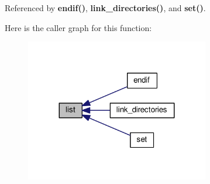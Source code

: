 Referenced by {\bf endif()}, {\bf link\+\_\+directories()}, and {\bf set()}.



Here is the caller graph for this function\+:
\nopagebreak
\begin{figure}[H]
\begin{center}
\leavevmode
\includegraphics[width=227pt]{da/d33/soapysdr_2lib_2CMakeLists_8txt_af03ead4c3d4e1bb32fa394b8a8ab10bf_icgraph}
\end{center}
\end{figure}


